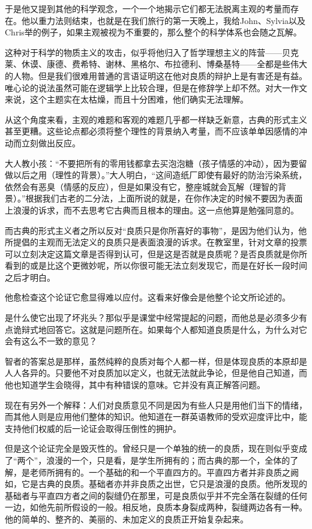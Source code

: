 \documentclass[UTF8]{article}
\begin{document}
\par 于是他又提到其他的科学观念，一个一个地揭示它们都无法脱离主观的考量而存在。他以重力法则结束，也就是在我们旅行的第一天晚上，我给John、Sylvia以及Chris举的例子，如果主观被视为不重要的，那么整个的科学体系也会随之瓦解。
\par 这种对于科学的物质主义的攻击，似乎将他归入了哲学理想主义的阵营——贝克莱、休谟、康德、费希特、谢林、黑格尔、布拉德利、博桑基特——全都是些伟大的人物。但是我们很难用普通的言语证明这在他对良质的辩护上是有害还是有益。唯心论的说法虽然可能在逻辑学上比较合理，但是在修辞学上却不然。对大一作文来说，这个主题实在太枯燥，而且十分困难，他们确实无法理解。
\par 从这个角度来看，主观的难题和客观的难题几乎都一样缺乏新意，古典的形式主义甚至更糟。这些论点都必须将整个理性的背景纳入考量，而不应该单单因感情的冲动而立刻做出反应。
\par 大人教小孩：“不要把所有的零用钱都拿去买泡泡糖（孩子情感的冲动），因为要留做以后之用（理性的背景）。”大人明白，“这间造纸厂即使有最好的防治污染系统，依然会有恶臭（情感的反应），但是如果没有它，整座城就会瓦解（理智的背景）。”根据我们古老的二分法，上面所说的就是，在你作决定的时候不要因为表面上浪漫的诉求，而不去思考它古典而且根本的理由。这一点他算是勉强同意的。
\par 而古典的形式主义者之所以反对“良质只是你所喜好的事物”，是因为他们认为，他所提倡的主观而无法定义的良质只是表面浪漫的诉求。在教室里，针对文章的投票可以立刻决定这篇文章是否得到认可，但是这是否就是良质呢？是否良质就是你所看到的或是比这个更微妙呢，所以你很可能无法立刻发现它，而是在好长一段时间之后才明白。
\par 他愈检查这个论证它愈显得难以应付。这看来好像会是他整个论文所论述的。
\par 是什么使它出现了坏兆头？那似乎是课堂中经常提起的问题，而他总是必须多少有点诡辩式地回答它。这就是问题所在。如果每个人都知道良质是什么，为什么对它会有这么不一致的意见？
\par 智者的答案总是那样，虽然纯粹的良质对每个人都一样，但是体现良质的本原却是人人各异的。只要他不对良质加以定义，也就无法就此争论，但是他自己知道，而他也知道学生会晓得，其中有种错误的意味。它并没有真正解答问题。
\par 现在有另外一个解释：人们对良质意见不同是因为有些人只是用他们当下的情绪，而其他人则是应用他们整体的知识。他知道在一群英语教师的受欢迎度评比中，能支持他们权威的后一论证会取得压倒性的拥护。
\par 但是这个论证完全是毁灭性的。曾经只是一个单独的统一的良质，现在则似乎变成了“两个”，浪漫的一个，只是看，是学生所拥有的；而古典的那一个，全体的了解，是老师所拥有的。一个基础的和一个平直四方的。平直四方者并非良质之阙如，它是古典的良质。基础者亦并非良质之出世，它只是浪漫的良质。他所发现的基础者与平直四方者之间的裂缝仍在那里，可是良质似乎并不完全落在裂缝的任何一边，如他先前所假设的一般。相反地，良质本身裂成两种，裂缝两边各有一种。他的简单的、整齐的、美丽的、未加定义的良质正开始复杂起来。
\end{document}
